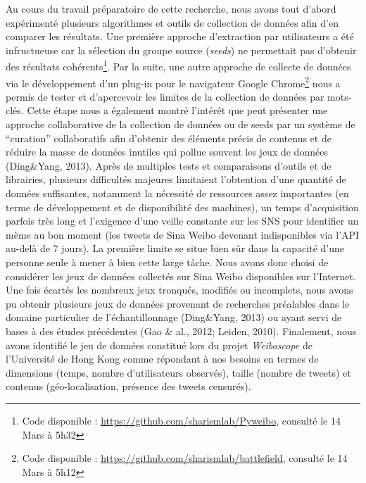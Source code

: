 Au cours du travail pr\'eparatoire de cette recherche, nous avons tout
d{\textquoteright}abord exp\'eriment\'e plusieurs algorithmes et outils
de collection de donn\'ees afin d{\textquoteright}en comparer les
r\'esultats. Une premi\`ere approche d{\textquoteright}extraction par
utilisateurs a \'et\'e infructueuse car la s\'election du groupe source
(\textit{seeds}) ne permettait pas d{\textquoteright}obtenir des
r\'esultats coh\'erents\footnote{ Code disponible :
\url{https://github.com/sharismlab/Pyweibo}, consult\'e le 14 Mars \`a
5h32}. Par la suite, une autre approche de collecte de donn\'ees via le
d\'eveloppement d{\textquoteright}un plug-in pour le navigateur Google
Chrome\footnote{ Code disponible :
\url{https://github.com/sharismlab/battlefield}, consult\'e le 14 Mars
\`a 5h12\par } nous a permis de tester et d{\textquoteright}apercevoir
les limites de la collection de donn\'ees par mots-cl\'es. Cette
\'etape nous a \'egalement montr\'e l{\textquoteright}int\'er\^et que
peut pr\'esenter une approche collaborative de la collection de
donn\'ees ou de seeds par un syst\`eme de
{\textquotedblleft}curation{\textquotedblright} collaboratifs afin
d{\textquoteright}obtenir des \'el\'ements pr\'ecis de contenus et de
r\'eduire la masse de donn\'ees inutiles qui pollue souvent les jeux de
donn\'ees (Ding\&Yang, 2013). Apr\`es de multiples tests et
comparaisons d{\textquoteright}outils et de librairies, plusieurs
difficult\'es majeures limitaient l{\textquoteright}obtention
d{\textquoteright}une quantit\'e de donn\'ees suffisantes, notamment la
n\'ecessit\'e de ressources assez importantes (en terme de
d\'eveloppement et de disponibilit\'e des machines), un temps
d{\textquoteright}acquisition parfois tr\`es long et
l{\textquoteright}exigence d{\textquoteright}une veille constante sur
les SNS pour identifier un m\`eme au bon moment (les tweets de Sina
Weibo devenant indisponibles via l{\textquoteright}API au-del\`a de 7
jours). La premi\`ere limite se situe bien s\^ur dans la capacit\'e
d{\textquoteright}une personne seule \`a mener \`a bien cette large
t\^ache. Nous avons donc choisi de consid\'erer les jeux de donn\'ees
collect\'es sur Sina Weibo disponibles sur l{\textquoteright}Internet.
Une fois \'ecart\'es les nombreux jeux tronqu\'es, modifi\'es ou
incomplets, nous avons pu obtenir plusieurs jeux de donn\'ees provenant
de recherches pr\'ealables dans le domaine particulier de
l{\textquoteright}\'echantillonnage (Ding\&Yang, 2013) ou ayant servi
de bases \`a des \'etudes pr\'ec\'edentes (Gao \& al., 2012; Leiden,
2010). Finalement, nous avons identifi\'e le jeu de donn\'ees
constitu\'e lors du projet \textit{Weiboscope }de
l{\textquoteright}Universit\'e de Hong Kong comme r\'epondant \`a nos
besoins en termes de dimensions (temps, nombre
d{\textquoteright}utilisateurs observ\'es), taille (nombre de tweets)
et contenus (g\'eo-localisation, pr\'esence des tweets censur\'es).



